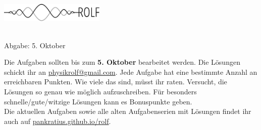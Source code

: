 \documentclass[a4paper]{article}
\begin{document}
	\vspace*{-1cm}
	\parbox{4cm}{\vspace{-0.2cm}\includegraphics[width=5cm]{../images/logo_scaled.pdf}}
	\parbox{10.6cm}{ \\
			Abgabe: 5. Oktober \\ \vspace*{-.5cm} }
		\vspace{0.5cm}

\thispagestyle{empty}
\begin{framed}
	\noindent
	\scriptsize
	Die Aufgaben sollten bis zum \textbf{5. Oktober} bearbeitet werden. Die Lösungen schickt ihr an \href{mailto:physikrolf@gmail.com}{physikrolf@gmail.com}.
	Jede Aufgabe hat eine bestimmte Anzahl an erreichbaren Punkten. Wie viele das sind, müsst ihr raten. Versucht, die Lösungen so genau wie möglich aufzuschreiben. Für besonders schnelle/gute/witzige Lösungen kann es Bonuspunkte geben.\\ Die aktuellen Aufgaben sowie alle alten Aufgabenserien mit Lösungen findet ihr auch auf \url{pankratius.github.io/rolf}. %
\end{framed}

\noindent

 
\newpage

\end{document}

